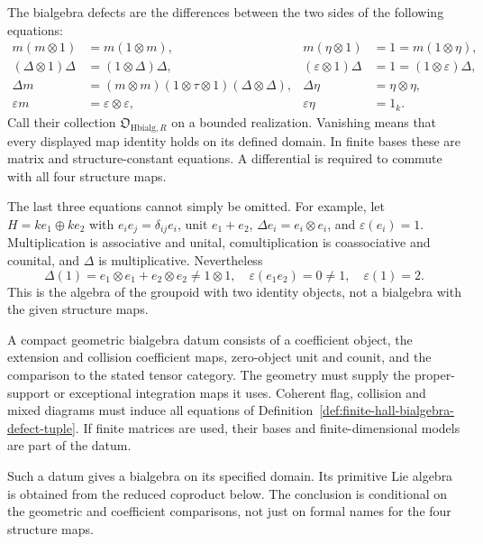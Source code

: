 \begin{definition}
\label{def:finite-hall-bialgebra-defect-tuple}
The bialgebra defects are the differences between the two sides
of the following equations:
\begin{align*}
 m(m\otimes1)&=m(1\otimes m),&
 m(\eta\otimes1)&=1=m(1\otimes\eta),\\
 (\Delta\otimes1)\Delta&=(1\otimes\Delta)\Delta,&
 (\varepsilon\otimes1)\Delta&=1=(1\otimes\varepsilon)\Delta,\\
 \Delta m&=(m\otimes m)(1\otimes\tau\otimes1)(\Delta\otimes\Delta),&
 \Delta\eta&=\eta\otimes\eta,\\
 \varepsilon m&=\varepsilon\otimes\varepsilon,&
 \varepsilon\eta&=1_k.
\end{align*}
Call their collection $\mathfrak O_{\mathrm{Hbialg},R}$ on a
bounded realization. Vanishing means that every displayed map
identity holds on its defined domain. In finite bases these are
matrix and structure-constant equations. A differential is
required to commute with all four structure maps.
\end{definition}

The last three equations cannot simply be omitted. For example,
let $H=ke_1\oplus ke_2$ with
$e_ie_j=\delta_{ij}e_i$, unit $e_1+e_2$,
$\Delta e_i=e_i\otimes e_i$, and $\varepsilon(e_i)=1$.
Multiplication is associative and unital, comultiplication is
coassociative and counital, and $\Delta$ is multiplicative.
Nevertheless
\[
 \Delta(1)=e_1\otimes e_1+e_2\otimes e_2\ne1\otimes1,
 \quad \varepsilon(e_1e_2)=0\ne1,
 \quad \varepsilon(1)=2.
\]
This is the algebra of the groupoid with two identity objects,
not a bialgebra with the given structure maps.

\begin{definition}
\label{def:compact-geometric-hall-bialgebra-datum}
A compact geometric bialgebra datum consists of a coefficient
object, the extension and collision coefficient maps, zero-object
unit and counit, and the comparison to the stated tensor category.
The geometry must supply the proper-support or exceptional
integration maps it uses. Coherent flag, collision and mixed
diagrams must induce all equations of
Definition~\ref{def:finite-hall-bialgebra-defect-tuple}.
If finite matrices are used, their bases and finite-dimensional
models are part of the datum.
\end{definition}

\begin{proposition}
\label{prop:geometric-hall-data-give-bialgebra-defects}
Such a datum gives a bialgebra on its specified domain. Its
primitive Lie algebra is obtained from the reduced coproduct
below. The conclusion is conditional on the geometric and
coefficient comparisons, not just on formal names for the four
structure maps.
\end{proposition}

